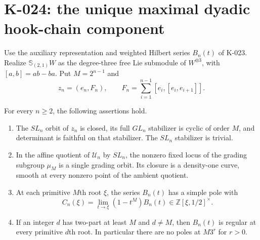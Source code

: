 \section{K-024: the unique maximal dyadic hook-chain component}

Use the auxiliary representation and weighted Hilbert series $B_n(t)$
of K-023.  Realize $\mathbb S_{(2,1)}W$ as the degree-three free
Lie submodule of $W^{\otimes3}$, with $[a,b]=ab-ba$.
Put $M=2^{n-1}$ and
\[
 z_n=(e_n,F_n),\qquad
            F_n=\sum_{i=1}^{n-1}[e_i,[e_i,e_{i+1}]].
\]

\begin{theorem}[K-024]
For every $n\ge2$, the following assertions hold.
\begin{enumerate}
\item The $SL_n$ orbit of $z_n$ is closed, its full $GL_n$
stabilizer is cyclic of order $M$, and determinant is faithful
on that stabilizer.  The $SL_n$ stabilizer is trivial.
\item In the affine quotient of $\mathcal U_n$ by $SL_n$, the
nonzero fixed locus of the grading subgroup $\mu_M$ is a single
grading orbit.  Its closure is a density-one curve, smooth at
every nonzero point of the ambient quotient.
\item At each primitive $M$th root $\xi$, the series $B_n(t)$
has a simple pole with
\[
                  C_n(\xi)=\lim_{t\to\xi}(1-t^M)B_n(t)
                       \in\mathbb Z[\xi,1/2]^\times.
                                                               \tag{K-024a}
\]
\item If an integer $d$ has two-part at least $M$ and $d\ne M$,
then $B_n(t)$ is regular at every primitive $d$th root.
In particular there are no poles at $M3^r$ for $r>0$.
\end{enumerate}
\end{theorem}

